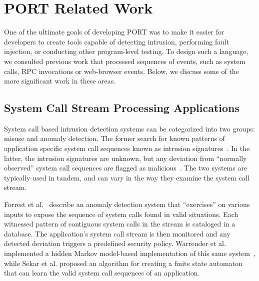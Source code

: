 \begin{comment}
\subsubsection{CheckAPI}

\textbf{\emph{This needs to be expanded}}
CheckAPI attempts to identify
\end{comment}



\section{PORT Related Work}
\label{PORT Related Work}

One of the ultimate goals of developing PORT
was to make it easier for developers to
create tools capable of detecting intrusion,
performing fault injection,
or conducting other program-level testing.
To design such a language,
we consulted
previous work
that processed sequences of events, such as
system calls, RPC invocations or
web-browser events.
Below, we discuss some of the more significant work in these areas.

\subsection{System Call Stream Processing Applications}

System call based intrusion detection systems
can be categorized into two groups: misuse and anomaly detection.
The former search for known patterns of application specific
system call
sequences known as intrusion signatures~\cite{GARCIATEODORO200918}.
In the latter, the intrusion signatures are unknown,
but any deviation
from ``normally observed'' system call sequences are flagged as
malicious~\cite{DBLP:conf/sp/ForrestHSL96}.
The two systems are typically used in tandem, and
can vary in the way they examine the system call stream.

Forrest et al.~\cite{DBLP:conf/sp/ForrestHSL96} describe
an anomaly detection system that
``exercises'' on various inputs to expose the
sequence of system calls found in valid situations.
Each witnessed pattern of contiguous system calls in the stream
is cataloged in a database.
The application's system call stream
is then monitored and any detected
deviation triggers a
predefined security policy.
Warrender et al. implemented a hidden Markov model-based implementation of this same system~\cite{DBLP:conf/sp/WarrenderFP99},
while
Sekar et al.\cite{DBLP:conf/sp/SekarBDB01} proposed
an algorithm
for creating a finite state automaton that can learn the valid system
call sequences of an application.

